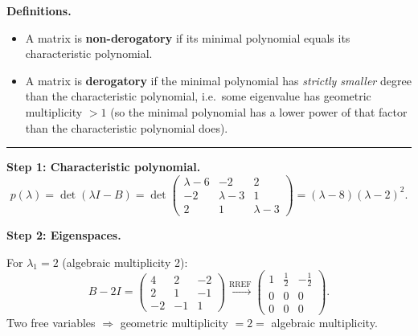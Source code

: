\documentclass[12pt,a3paper]{article}
\begin{document}
\begin{tcolorbox}[enhanced,breakable,
  colback=cE!4,colframe=cE,boxrule=0.8pt,arc=5pt,
  title={\textbf{Answer --- Derogatory Test for
    $B=\begin{pmatrix}6&2&-2\\2&3&-1\\-2&-1&3\end{pmatrix}$}},
  fonttitle=\bfseries\color{white},colbacktitle=cE]
 
\textbf{Definitions.}
\begin{itemize}[itemsep=2pt]
  \item A matrix is \textbf{non-derogatory} if its minimal polynomial equals its
        characteristic polynomial.
  \item A matrix is \textbf{derogatory} if the minimal polynomial has \emph{strictly
        smaller} degree than the characteristic polynomial, i.e.\ some eigenvalue has
        geometric multiplicity $>1$ (so the minimal polynomial has a lower power of
        that factor than the characteristic polynomial does).
\end{itemize}
 
\medskip\textcolor{cE}{\rule{\textwidth}{0.4pt}}
 
\textbf{Step 1: Characteristic polynomial.}
\[
  p(\lambda) = \det(\lambda I - B)
  = \det\begin{pmatrix}\lambda-6&-2&2\\-2&\lambda-3&1\\2&1&\lambda-3\end{pmatrix}
  = (\lambda-8)(\lambda-2)^2.
\]
 
\textbf{Step 2: Eigenspaces.}
 
For $\lambda_1 = 2$ (algebraic multiplicity 2):
\[
  B - 2I = \begin{pmatrix}4&2&-2\\2&1&-1\\-2&-1&1\end{pmatrix}
  \xrightarrow{\text{RREF}}
  \begin{pmatrix}1&\frac{1}{2}&-\frac{1}{2}\\0&0&0\\0&0&0\end{pmatrix}.
\]
Two free variables $\Rightarrow$ geometric multiplicity $= 2 =$ algebraic multiplicity.
 

\end{tcolorbox}
\end{document}
